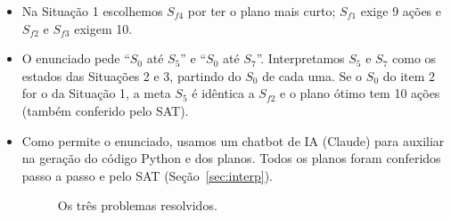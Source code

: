 \begin{itemize}
	\item Na Situação 1 escolhemos $S_{f4}$ por ter o plano mais curto; $S_{f1}$ exige 9
	ações e $S_{f2}$ e $S_{f3}$ exigem 10.
	\item O enunciado pede ``$S_0$ até $S_5$'' e ``$S_0$ até $S_7$''. Interpretamos
	$S_5$ e $S_7$ como os estados das Situações 2 e 3, partindo do $S_0$ de cada
	uma. Se o $S_0$ do item 2 for o da Situação 1, a meta $S_5$ é idêntica a
	$S_{f2}$ e o plano ótimo tem 10 ações (também conferido pelo SAT).
	\item Como permite o enunciado, usamos um chatbot de IA (Claude) para auxiliar na
	geração do código Python e dos planos. Todos os planos foram conferidos passo a
	passo e pelo SAT (Seção~\ref{sec:interp}).
	
	\begin{figure}[H]
		\centering
		\caption{Os três problemas resolvidos.}
		\label{fig:problema}
	\end{figure}
	
	
\end{itemize}

